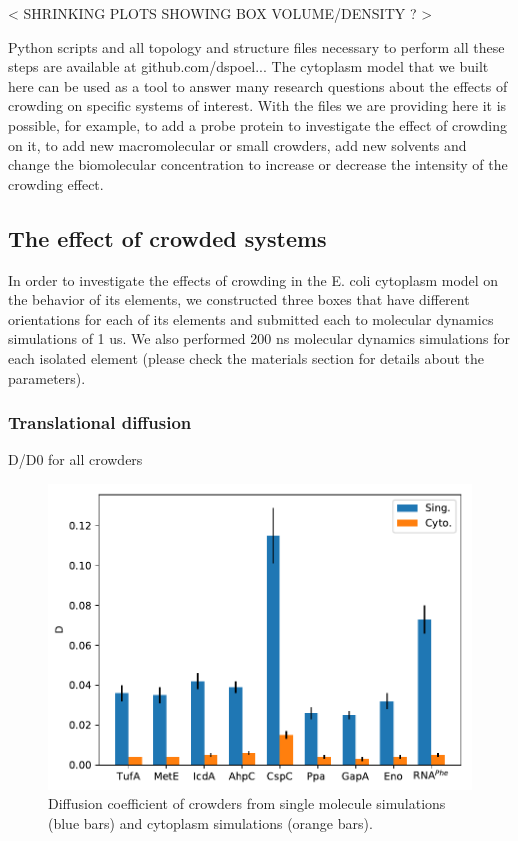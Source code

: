 \documentclass[journal=jacsat,manuscript=article]{achemso}
\begin{document}
< SHRINKING PLOTS SHOWING BOX VOLUME/DENSITY ? >


Python scripts and all topology and structure files necessary to perform all these steps are available at github.com/dspoel... The cytoplasm model that we built here can be used as a tool to answer many research questions about the effects of crowding on specific systems of interest. With the files we are providing here it is possible, for example, to add a probe protein to investigate the effect of crowding on it, to add new macromolecular or small crowders, add new solvents and change the biomolecular concentration to increase or decrease the intensity of the crowding effect.
 


\subsection{The effect of crowded systems}

In order to investigate the effects of crowding in the E. coli cytoplasm model on the behavior of its elements, we constructed three boxes that have different orientations for each of its elements and submitted each to molecular dynamics simulations of 1 us. We also performed 200 ns molecular dynamics simulations for each isolated element (please check the materials section for details about the parameters).

\subsubsection{Translational diffusion}
D/D0 for all crowders

\begin{figure}

\includegraphics[scale=0.6]{msd.pdf}
\caption{Diffusion coefficient of crowders from single molecule simulations (blue bars) and cytoplasm simulations (orange bars).}
\end{figure}
\end{document}
